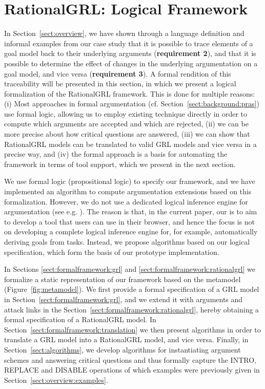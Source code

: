 \section{RationalGRL: Logical Framework}
\label{sect:formalframework}

In Section~\ref{sect:overview}, we have shown through a language definition and informal examples from our case study that it is possible to trace elements of a goal model back to their underlying arguments (\textbf{requirement 2}), and that it is possible to determine the effect of changes in the underlying argumentation on a goal model, and vice versa (\textbf{requirement 3}). A formal rendition of this traceability will be presented in this section, in which we present a logical formalization of the RationalGRL framework. This is done for multiple reasons: (i) Most approaches in formal argumentation (cf. Section~\ref{sect:background:pras}) use formal logic, allowing us to employ existing technique directly in order to compute which arguments are accepted and which are rejected, (ii) we can be more precise about how critical questions are answered, (iii) we can show that RationalGRL models can be translated to valid GRL models and vice versa in a precise way, and (iv) the formal approach is a basis for automating the framework in terms of tool support, which we present in the next section.

We use formal logic (propositional logic) to specify our framework, and we have implemented an algorithm to compute argumentation extensions based on this formalization. However, we do not use a dedicated logical inference engine for argumentation (see e.g. \cite{hecham2018first}). The reason is that, in the current paper, our is to aim to develop a tool that users can use in their browser, and  hence the focus is not on developing a complete logical inference engine for, for example, automatically deriving goals from tasks. Instead, we propose algorithms based on our logical specification, which form the basis of our prototype implementation.

In Sections \ref{sect:formalframework:grl} and \ref{sect:formalframework:rationalgrl} we formalize a static representation of our framework based on the metamodel (Figure~\ref{fig:metamodel}). We first provide a formal specification of a GRL model in Section~\ref{sect:formalframework:grl}, and we extend it with arguments and attack links in the Section~\ref{sect:formalframework:rationalgrl}, hereby obtaining a formal specification of a RationalGRL model. In Section~\ref{sect:formalframework:translation} we then present algorithms in order to translate a GRL model into a RationalGRL model, and vice versa. Finally, in Section~\ref{sect:algorithms}, we develop algorithms for instantiating argument schemes and answering critical questions and thus formally capture the \textsf{INTRO}, \textsf{REPLACE} and \textsf{DISABLE} operations of which examples were previously given in Section~\ref{sect:overview:examples}. 

